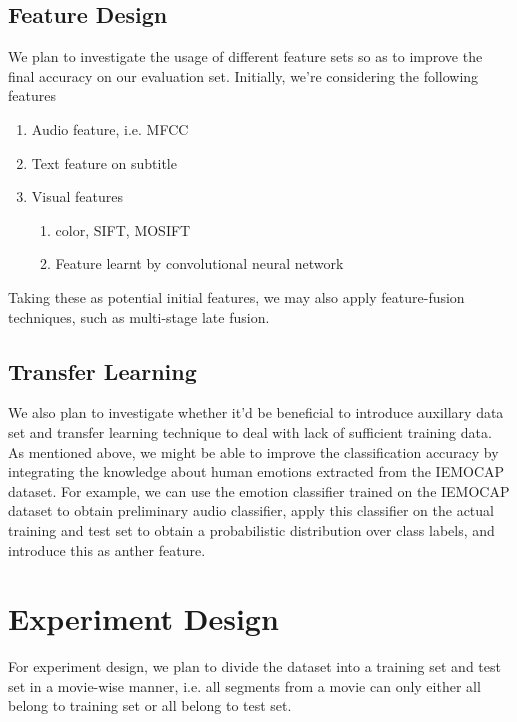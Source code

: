 \documentclass[a4page]{article}
\begin{document}
\subsection{Feature Design}
We plan to investigate the usage of different feature sets so as to improve the final accuracy on our evaluation set. Initially, we're considering the following features\cite{zeng2009survey}\cite{ververidis2006emotional}\cite{el2011survey}

\begin{enumerate}
\item Audio feature, i.e. MFCC
\item Text feature on subtitle
\item Visual features
    \begin{enumerate}
    \item color, SIFT, MOSIFT
    \item Feature learnt by convolutional neural network\cite{kim2013deep}
    \end{enumerate}
\end{enumerate}

Taking these as potential initial features, we may also apply feature-fusion techniques, such as multi-stage late fusion. 

\subsection{Transfer Learning}

We also plan to investigate whether it'd be beneficial to introduce auxillary data set and transfer learning technique to deal with lack of sufficient training data. As mentioned above, we might be able to improve the classification accuracy by integrating the knowledge about human emotions extracted from the IEMOCAP dataset. For example, we can use the emotion classifier trained on the IEMOCAP dataset to obtain preliminary audio classifier, apply this classifier on the actual training and test set to obtain a probabilistic distribution over class labels, and introduce this as anther feature.  

\section{Experiment Design}

For experiment design, we plan to divide the dataset into a training set and test set in a movie-wise manner, i.e. all segments from a movie can only either all belong to training set or all belong to test set. \\
\end{document}
